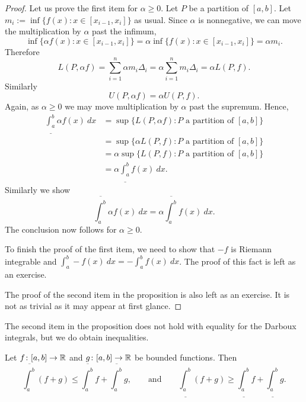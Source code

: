 \begin{proof}
Let us prove the first item for $\alpha \geq 0$. 
Let $P$ be a partition of $[a,b]$.
Let $m_i := \inf \{ f(x) : x \in [x_{i-1},x_i] \}$ as usual.
Since $\alpha$ is nonnegative, we can move the multiplication by $\alpha$
past the infimum,
\begin{equation*}
\inf \{ \alpha f(x) : x \in [x_{i-1},x_i] \}
=
\alpha \inf \{ f(x) : x \in [x_{i-1},x_i] \} = \alpha m_i .
\end{equation*}
Therefore
\begin{equation*}
L(P,\alpha f) =
\sum_{i=1}^n \alpha m_i \Delta_i = \alpha \sum_{i=1}^n m_i \Delta_i = \alpha
L(P,f).
\end{equation*}
Similarly 
\begin{equation*}
U(P,\alpha f) = \alpha U(P,f) .
\end{equation*}
Again, as $\alpha \geq 0$ we
may move multiplication by $\alpha$ past the supremum.  Hence,
\begin{equation*}
\begin{split}
\underline{\int_a^b} \alpha f(x)~dx & =
\sup \{ L(P,\alpha f) : \text{$P$ a partition of $[a,b]$} \}
\\
& =
\sup \{ \alpha L(P,f) : \text{$P$ a partition of $[a,b]$} \}
\\
& =
\alpha
\sup \{ L(P,f) : \text{$P$ a partition of $[a,b]$} \}
\\
& =
\alpha
\underline{\int_a^b} f(x)~dx .
\end{split}
\end{equation*}
Similarly we show 
\begin{equation*}
\overline{\int_a^b} \alpha f(x)~dx
=
\alpha
\overline{\int_a^b} f(x)~dx .
\end{equation*}
The conclusion now follows for $\alpha \geq 0$.

To finish the proof of the first item, we need to show 
that $-f$ is Riemann integrable and
$\int_a^b - f(x)~dx =
-
\int_a^b f(x)~dx$.  The proof of this fact is left as an exercise.

The proof of the second item in the proposition is also left as an exercise.
It is not as
trivial as it may appear at first glance.
\end{proof}

The second item in the proposition does not hold with
equality for the Darboux integrals, but we do obtain inequalities.

\begin{prop} \label{prop:upperlowerlinineq}
Let $f \colon [a,b] \to {\mathbb{R}}$ and $g \colon [a,b] \to {\mathbb{R}}$ be bounded
functions.  Then
\begin{equation*}
\overline{\int_a^b} (f+g) \leq \overline{\int_a^b}f+\overline{\int_a^b}g
,
\qquad
\text{and}
\qquad
\underline{\int_a^b} (f+g) \geq \underline{\int_a^b}f+\underline{\int_a^b}g
.
\end{equation*}
\end{prop}

